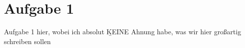 \section{Aufgabe 1}
Aufgabe 1 hier, wobei ich absolut \b{KEINE} Ahnung habe, was wir hier großartig schreiben sollen



